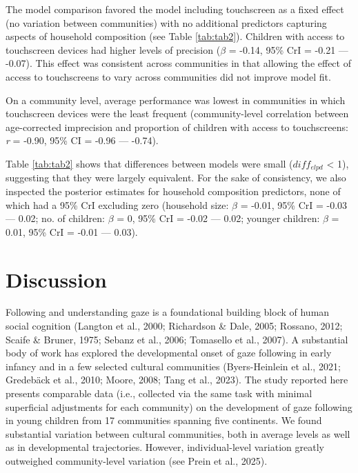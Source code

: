 \documentclass[
  man,floatsintext]{apa7}
\begin{document}
The model comparison favored the model including touchscreen as a fixed effect (no variation between communities) with no additional predictors capturing aspects of household composition (see Table \ref{tab:tab2}). Children with access to touchscreen devices had higher levels of precision (\(\beta\) = -0.14, 95\% CrI = -0.21 --- -0.07). This effect was consistent across communities in that allowing the effect of access to touchscreens to vary across communities did not improve model fit.

On a community level, average performance was lowest in communities in which touchscreen devices were the least frequent (community-level correlation between age-corrected imprecision and proportion of children with access to touchscreens: \emph{r} = -0.90, 95\% CI = -0.96 --- -0.74).

Table \ref{tab:tab2} shows that differences between models were small (\(diff_{elpd}\) \textless{} 1), suggesting that they were largely equivalent. For the sake of consistency, we also inspected the posterior estimates for household composition predictors, none of which had a 95\% CrI excluding zero (household size: \(\beta\) = -0.01, 95\% CrI = -0.03 --- 0.02; no. of children: \(\beta\) = 0, 95\% CrI = -0.02 --- 0.02; younger children: \(\beta\) = 0.01, 95\% CrI = -0.01 --- 0.03).

\section{Discussion}\label{discussion}

Following and understanding gaze is a foundational building block of human social cognition (Langton et al., 2000; Richardson \& Dale, 2005; Rossano, 2012; Scaife \& Bruner, 1975; Sebanz et al., 2006; Tomasello et al., 2007). A substantial body of work has explored the developmental onset of gaze following in early infancy and in a few selected cultural communities (Byers-Heinlein et al., 2021; Gredebäck et al., 2010; Moore, 2008; Tang et al., 2023). The study reported here presents comparable data (i.e., collected via the same task with minimal superficial adjustments for each community) on the development of gaze following in young children from 17 communities spanning five continents. We found substantial variation between cultural communities, both in average levels as well as in developmental trajectories. However, individual-level variation greatly outweighed community-level variation (see Prein et al., 2025).
\end{document}
